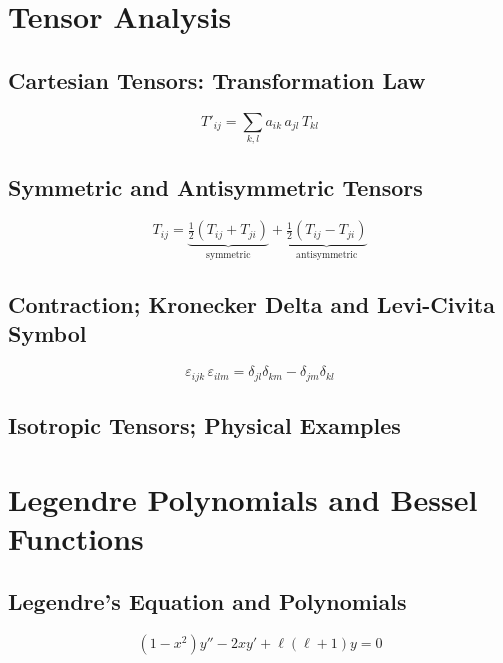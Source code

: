 \documentclass[11pt, letterpaper]{article}
\theoremstyle{plain}
\begin{document}
\section{Tensor Analysis}                 %

\subsection{Cartesian Tensors: Transformation Law}
\[
  T'_{ij} = \sum_{k,l} a_{ik}\,a_{jl}\,T_{kl}
\]

\subsection{Symmetric and Antisymmetric Tensors}
\[
  T_{ij} = \underbrace{\tfrac{1}{2}(T_{ij}+T_{ji})}_{\text{symmetric}}
          + \underbrace{\tfrac{1}{2}(T_{ij}-T_{ji})}_{\text{antisymmetric}}
\]

\subsection{Contraction; Kronecker Delta and Levi-Civita Symbol}
\[
  \varepsilon_{ijk}\,\varepsilon_{ilm} = \delta_{jl}\delta_{km} - \delta_{jm}\delta_{kl}
\]

\subsection{Isotropic Tensors; Physical Examples}




\section{Legendre Polynomials and Bessel Functions} %

\subsection{Legendre's Equation and Polynomials}
\[
  (1-x^2)y'' - 2xy' + \ell(\ell+1)y = 0
\]
\end{document}
